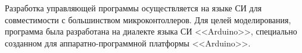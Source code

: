 Разработка управляющей программы осуществляется на языке СИ для совместимости с большинством микроконтоллеров. Для целей моделирования, программа была разработана на диалекте языка СИ <<Arduino>>, специально созданном для аппаратно-программной платформы <<Arduino>>.
